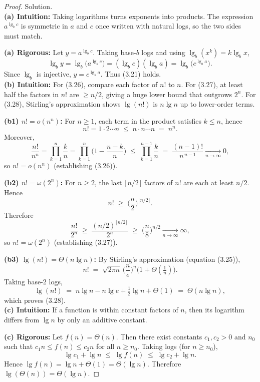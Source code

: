 \documentclass[12pt]{article}
\theoremstyle{definition}
\begin{document}
\begin{proof}
Solution. \\

\noindent
\textbf{(a) Intuition:}
Taking logarithms turns exponents into products. The expression \(a^{\lg_b c}\) is symmetric
in \(a\) and \(c\) once written with natural logs, so the two sides must match.

\noindent
\textbf{(a) Rigorous:}
Let \(y=a^{\lg_b c}\). Taking base-\(b\) logs and using \(\lg_b(x^k)=k\lg_b x\),
\[
\lg_b y=\lg_b\!\Big(a^{\lg_b c}\Big)=(\lg_b c)(\lg_b a)=\lg_b\!\Big(c^{\lg_b a}\Big).
\]
Since \(\lg_b\) is injective, \(y=c^{\lg_b a}\). Thus (3.21) holds. \\[6pt]

\noindent
\textbf{(b) Intuition:}
For (3.26), compare each factor of \(n!\) to \(n\).
For (3.27), at least half the factors in \(n!\) are \(\ge n/2\), giving a huge lower bound that outgrows \(2^n\).
For (3.28), Stirling’s approximation shows \(\lg(n!)\) is \(n\lg n\) up to lower-order terms.

\noindent
\textbf{(b1) \(n! = o(n^n)\):}
For \(n\ge1\), each term in the product satisfies \(k\le n\), hence
\[
n!=1\cdot2\cdots n \;\le\; n\cdot n\cdots n \;=\; n^n.
\]
Moreover,
\[
\frac{n!}{n^n}=\prod_{k=1}^n \frac{k}{n}=\prod_{k=1}^n\Big(1-\frac{n-k}{n}\Big)
\;\le\;\prod_{k=1}^{n-1}\frac{k}{n}
\;=\;\frac{(n-1)!}{n^{\,n-1}}\xrightarrow[n\to\infty]{}0,
\]
so \(n!=o(n^n)\) (establishing (3.26)).

\noindent
\textbf{(b2) \(n! = \omega(2^n)\):}
For \(n\ge 2\), the last \(\lfloor n/2\rfloor\) factors of \(n!\) are each at least \(n/2\). Hence
\[
n!\;\ge\;\Big(\frac{n}{2}\Big)^{\lfloor n/2\rfloor}.
\]
Therefore
\[
\frac{n!}{2^n}\;\ge\;\frac{(n/2)^{\lfloor n/2\rfloor}}{2^n}
\;\ge\;\Big(\frac{n}{8}\Big)^{\!n/2}\xrightarrow[n\to\infty]{}\infty,
\]
so \(n!=\omega(2^n)\) (establishing (3.27)).

\noindent
\textbf{(b3) \(\lg(n!)=\Theta(n\lg n)\):}
By Stirling’s approximation (equation (3.25)),
\[
n!\;=\;\sqrt{2\pi n}\,\Big(\frac{n}{e}\Big)^{\!n}\!\Big(1+\Theta(\tfrac{1}{n})\Big).
\]
Taking base-2 logs,
\[
\lg(n!) \;=\; n\lg n - n\lg e + \tfrac{1}{2}\lg n + \Theta(1)
\;=\; \Theta(n\lg n),
\]
which proves (3.28). \\[6pt]

\noindent
\textbf{(c) Intuition:}
If a function is within constant factors of \(n\), then its logarithm differs from \(\lg n\) by only an
additive constant.

\noindent
\textbf{(c) Rigorous:}
Let \(f(n)=\Theta(n)\). Then there exist constants \(c_1,c_2>0\) and \(n_0\) such that
\(c_1 n \le f(n) \le c_2 n\) for all \(n\ge n_0\). Taking logs (for \(n\ge n_0\)),
\[
\lg c_1 + \lg n \;\le\; \lg f(n) \;\le\; \lg c_2 + \lg n .
\]
Hence \(\lg f(n) = \lg n + \Theta(1) = \Theta(\lg n)\). Therefore \(\lg(\Theta(n))=\Theta(\lg n)\).
\end{proof}
\end{document}
